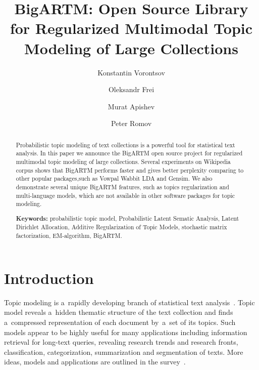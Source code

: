 \documentclass{llncs}
\begin{document}
\title{
    BigARTM: Open Source Library for
    Regularized Multimodal %
    Topic Modeling of Large Collections
}
\author{
    Konstantin Vorontsov
    \and
    Oleksandr Frei
    \and
    Murat Apishev
    \and
    Peter Romov
}

\maketitle

\begin{abstract}
Probabilistic topic modeling of text collections is a powerful tool for statistical text analysis.
In this paper we announce the BigARTM open source project for regularized multimodal topic modeling of large collections.
Several experiments on Wikipedia corpus shows that BigARTM performs faster and gives better perplexity
comparing to other popular packages,such as Vowpal Wabbit LDA and Gensim.
We also demonstrate several unique BigARTM features, such as topics regularization and multi-language models,
which are not available in other software packages for topic modeling.

\vspace{1em}
\textbf{Keywords:}
    probabilistic topic model,
    Probabilistic Latent Sematic Analysis,
    Latent Dirichlet Allocation,
    Additive Regularization of Topic Models,
    stochastic matrix factorization,
    EM-algorithm,
    BigARTM.
\end{abstract}

\section{Introduction}

Topic modeling is a~rapidly developing branch of statistical text analysis~\cite{blei12ptm}.
Topic model reveals a~hidden thematic structure of the text collection
and finds a~compressed representation of each document by~a~set of its topics.
Such models appear to be highly useful for many applications including
information retrieval for long-text queries,
revealing research trends and research fronts,
classification, categorization, summarization and segmentation of texts.
More ideas, models and applications are outlined in the survey~\cite{daud10knowledge}.
\end{document}
